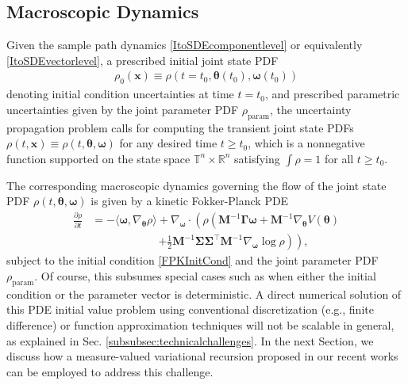 \documentclass[10pt,twocolumn]{IEEEtran}
\begin{document}
\subsection{Macroscopic Dynamics}\label{subsec:macroscopic}
Given the sample path dynamics \eqref{ItoSDEcomponentlevel} or equivalently \eqref{ItoSDEvectorlevel}, a prescribed initial joint state PDF 
\begin{align}
\rho_{0}(\bm{x})\equiv\rho(t=t_{0},\bm{\theta}(t_{0}),\bm{\omega}(t_{0}))
\label{FPKInitCond}	
\end{align} 
denoting initial condition uncertainties at time $t=t_{0}$, and prescribed parametric uncertainties given by the joint parameter PDF $\rho_{\text{param}}$, the uncertainty propagation problem calls for computing the transient joint state PDFs $\rho(t,\bm{x})\equiv\rho(t,\bm{\theta},\bm{\omega})$ for any desired time $t \geq t_{0}$, which is a nonnegative function supported on the state space $\mathbb{T}^{n} \times \mathbb{R}^{n}$ satisfying $\int \rho = 1$ for all $t\geq t_{0}$.

The corresponding macroscopic dynamics governing the flow of the joint state PDF $\rho(t,\bm{\theta},\bm{\omega})$ is given by a kinetic Fokker-Planck \cite{villani2006hypocoercive} PDE
\begin{align}
\frac{\partial \rho}{\partial t} &= - \langle \bm{\omega},\nabla_{\bm{\theta}}\rho \rangle  + \nabla_{\bm{\omega}} \cdot \left( \rho \left( \bm{M}^{-1}\bm{\Gamma}\bm{\omega} + \bm{M}^{-1}\nabla_{\bm{\theta}}V(\bm{\theta}) \right.\right.\nonumber\\
&\qquad\qquad\qquad \left.\left. +\frac{1}{2} \bm{M}^{-1}\bm{\Sigma}\bm{\Sigma}^{\top}\bm{M}^{-1} \nabla_{\bm{\omega}} \log \rho \right) \right),
\label{KineticFPK}	
\end{align}
subject to the initial condition \eqref{FPKInitCond} and the joint parameter PDF $\rho_{\text{param}}$. Of course, this subsumes special cases such as when either the initial condition or the parameter vector is deterministic. A direct numerical solution of this PDE initial value problem using conventional discretization (e.g., finite difference) or function approximation techniques will not be scalable in general, as explained in Sec. \ref{subsubsec:technicalchallenges}. In the next Section, we discuss how a measure-valued variational recursion proposed in our recent works \cite{caluya2019ACC,caluya2019TAC,halder2020hopfield,caluya2021TAC,caluya2020reflected} can be employed to address this challenge.
\end{document}
